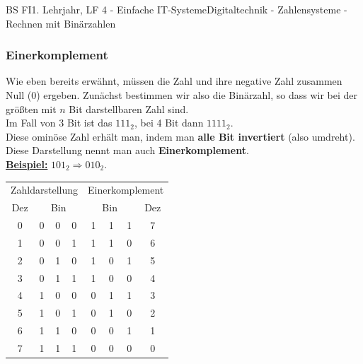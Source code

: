 \documentclass[11pt,twocolumn,oneside,openany,headings=optiontotoc,11pt,numbers=noenddot]{article}
\begin{document}
\begin{worksheet}{BS FI}{1. Lehrjahr, LF 4 - Einfache IT-Systeme}{Digitaltechnik - Zahlensysteme - Rechnen mit Binärzahlen}
		\subsubsection*{Einerkomplement}
		Wie eben bereits erwähnt, müssen die Zahl und ihre negative Zahl zusammen Null (0) ergeben. Zunächst bestimmen wir also die Binärzahl, so dass wir bei der größten mit \(n\) Bit darstellbaren Zahl sind.\\
		\tiny{Im Fall von 3 Bit ist das \(111_2\), bei 4 Bit dann \(1111_2\).}\normalsize\\
		Diese ominöse Zahl erhält man, indem man \textbf{alle Bit invertiert} (also umdreht). Diese Darstellung nennt man auch \textbf{Einerkomplement}.\\
		\textbf{\underline{Beispiel:}} \(101_2 \Rightarrow 010_2\).\\
		\par\noindent
		\begin{tabularx}{0.48\textwidth}{c|lll||rrr|c}
			\multicolumn{4}{c||}{Zahldarstellung} & \multicolumn{4}{c}{Einerkomplement}\\
			Dez & \multicolumn{3}{c||}{Bin} & \multicolumn{3}{c}{Bin} & Dez\\
			\cline{1-8}
			0 & 0 & 0 & 0 & 1 & 1 & 1 & 7\\
			1 & 0 & 0 & 1 & 1 & 1 & 0 & 6\\
			2 & 0 & 1 & 0 & 1 & 0 & 1 & 5\\
			3 & 0 & 1 & 1 & 1 & 0 & 0 & 4\\
			4 & 1 & 0 & 0 & 0 & 1 & 1 & 3\\
			5 & 1 & 0 & 1 & 0 & 1 & 0 & 2\\
			6 & 1 & 1 & 0 & 0 & 0 & 1 & 1\\
			7 & 1 & 1 & 1 & 0 & 0 & 0 & 0
		\end{tabularx}\\

\end{worksheet}
\end{document}
